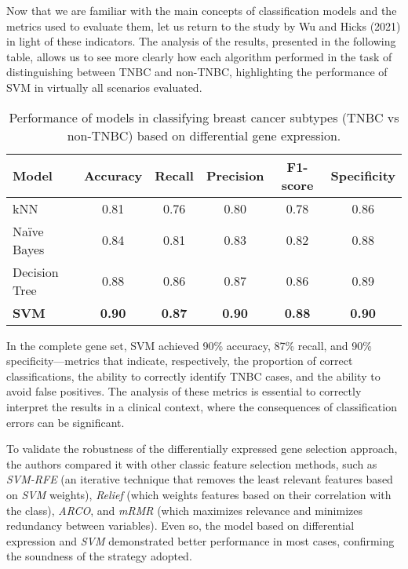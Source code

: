 Now that we are familiar with the main concepts of classification models and
the metrics used to evaluate them, let us return to the study by Wu and Hicks
(2021) in light of these indicators. The analysis of the results, presented in
the following table, allows us to see more clearly how each algorithm performed
in the task of distinguishing between TNBC and non-TNBC, highlighting the
performance of SVM in virtually all scenarios evaluated.

\begin{table}[h!]
  \centering
  \begin{tabular}{|l|c|c|c|c|c|}
    \hline
    \textbf{Model} & \textbf{Accuracy} & \textbf{Recall} & \textbf{Precision} & \textbf{F1-score} & \textbf{Specificity} \\
    \hline
    kNN            & 0.81              & 0.76            & 0.80               & 0.78              & 0.86                 \\
    Naïve Bayes    & 0.84              & 0.81            & 0.83               & 0.82              & 0.88                 \\
    Decision Tree  & 0.88              & 0.86            & 0.87               & 0.86              & 0.89                 \\
    \textbf{SVM}   & \textbf{0.90}     & \textbf{0.87}   & \textbf{0.90}      & \textbf{0.88}     & \textbf{0.90}        \\
    \hline
  \end{tabular}
  \caption{Performance of models in classifying breast cancer subtypes (TNBC vs non-TNBC) based on differential gene expression.}
  \label{tab:model-performance}
\end{table}

In the complete gene set, SVM achieved 90\% accuracy, 87\% recall, and 90\%
specificity—metrics that indicate, respectively, the proportion of correct
classifications, the ability to correctly identify TNBC cases, and the ability
to avoid false positives. The analysis of these metrics is essential to
correctly interpret the results in a clinical context, where the consequences
of classification errors can be significant.

To validate the robustness of the differentially expressed gene selection
approach, the authors compared it with other classic feature selection methods,
such as \textit{SVM-RFE} (an iterative technique that removes the least
relevant features based on \textit{SVM} weights), \textit{Relief} (which
weights features based on their correlation with the class), \textit{ARCO}, and
\textit{mRMR} (which maximizes relevance and minimizes redundancy between
variables). Even so, the model based on differential expression and
\textit{SVM} demonstrated better performance in most cases, confirming the
soundness of the strategy adopted.

